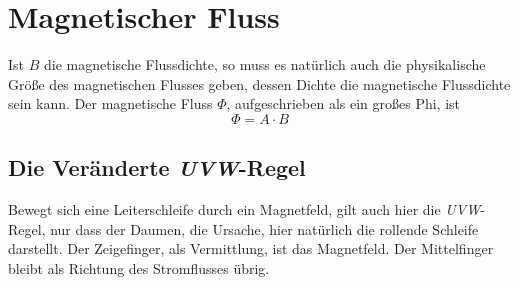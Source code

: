 \documentclass{article}
\begin{document}
\section{Magnetischer Fluss}  
Ist $B$ die magnetische Flussdichte, so muss es natürlich auch die physikalische Größe des magnetischen Flusses geben, dessen Dichte die magnetische Flussdichte sein kann. Der magnetische Fluss $\Phi$, aufgeschrieben als ein großes Phi, ist
\[
 \Phi = A \cdot B 
\]  
 
\subsection{Die Veränderte \emph{UVW}-Regel} 
Bewegt sich eine Leiterschleife durch ein Magnetfeld, gilt auch hier die \emph{UVW}-Regel, nur dass der Daumen, die Ursache, hier natürlich die rollende Schleife darstellt. Der Zeigefinger, als Vermittlung, ist das Magnetfeld. Der Mittelfinger bleibt als Richtung des Stromflusses übrig. 
\end{document}
